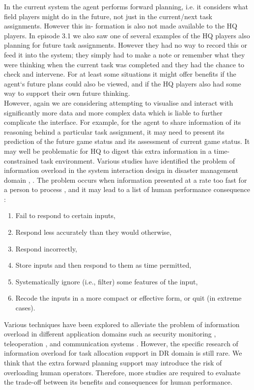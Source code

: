 In the current system the agent performs forward planning, i.e. it considers what field players might do in the future, not just in the current/next task assignments. However this in- formation is also not made available to the HQ players. In episode 3.1 we also saw one of several examples of the HQ players also planning for future task assignments. However they had no way to record this or feed it into the system; they simply had to make a note or remember what they were thinking when the current task was completed and they had the chance to check and intervene. For at least some situations it might offer benefits if the agent`s future plans could also be viewed, and if the HQ players also had some way to support their own future thinking.\\

However, again we are considering attempting to visualise and interact with significantly more data and more complex data which is liable to further complicate the interface. For example, for the agent to share information of its reasoning behind a particular task assignment, it may need to present its prediction of the future game status and its assessment of current game status. It may well be problematic for HQ to digest this extra information in a time-constrained task environment. Various studies have identified the problem of information overload in the system interaction design in disaster management domain \cite{Carver2007}, \cite{Turoff2004a}. The problem occurs when information presented at a rate too fast for a person to process \cite{Hiltz1985}, and it may lead to a list of human performance consequence \cite{Hiltz1985}:\\

\begin{enumerate}
\item Fail to respond to certain inputs,
\item Respond less accurately than they would otherwise,
\item Respond incorrectly,
\item Store inputs and then respond to them as time permitted,
\item Systematically ignore (i.e., filter) some features of the input,
\item Recode the inputs in a more compact or effective form, or quit (in extreme cases).
\end{enumerate}

Various techniques have been explored to alleviate the problem of information overload in different application domains such as security monitoring \cite{Conti2006}, teleoperation \cite{Kadous2006}, and communication systems \cite{Hiltz1985}. However, the specific research of information overload for task allocation support in DR domain is still rare. We think that the extra forward planning support may introduce the risk of overloading human operators. Therefore, more studies are required to evaluate the trade-off between its benefits and consequences for human performance.\\



